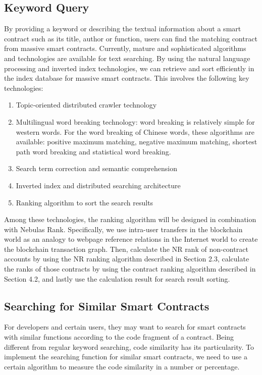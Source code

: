 \subsection{Keyword Query}

By providing a keyword or describing the textual information about a smart contract such as its title, author or function, users can find the matching contract from massive smart contracts. Currently, mature and sophisticated algorithms and technologies are available for text searching. By using the natural language processing and inverted index technologies, we can retrieve and sort efficiently in the index database for massive smart contracts. This involves the following key technologies:

\begin{enumerate}
	\item Topic-oriented distributed crawler technology
	\item Multilingual word breaking technology: word breaking is relatively simple for western words. For the word breaking of Chinese words, these algorithms are available: positive maximum matching, negative maximum matching, shortest path word breaking and statistical word breaking.
	\item Search term correction and semantic comprehension
	\item Inverted index and distributed searching architecture
	\item Ranking algorithm to sort the search results

\end{enumerate}

Among these technologies, the ranking algorithm will be designed in combination with Nebulas Rank. Specifically, we use intra-user transfers in the blockchain world as an analogy to webpage reference relations in the Internet world to create the blockchain transaction graph. Then, calculate the NR rank of non-contract accounts by using the NR ranking algorithm described in Section 2.3, calculate the ranks of those contracts by using the contract ranking algorithm described in Section 4.2, and lastly use the calculation result for search result sorting.


\subsection{Searching for Similar Smart Contracts}

For developers and certain users, they may want to search for smart contracts with similar functions according to the code fragment of a contract. Being different from regular keyword searching, code similarity has its particularity. To implement the searching function for similar smart contracts, we need to use a certain algorithm to measure the code similarity in a number or percentage.

